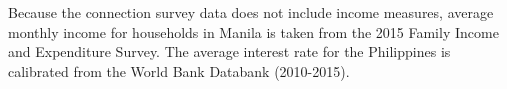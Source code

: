 \documentclass[12pt]{article}
\begin{document}
Because the connection survey data does not include income measures, average monthly income for households in Manila is taken from the 2015 Family Income and Expenditure Survey.  The average interest rate for the Philippines is calibrated from the World Bank Databank (2010-2015).








\end{document}
